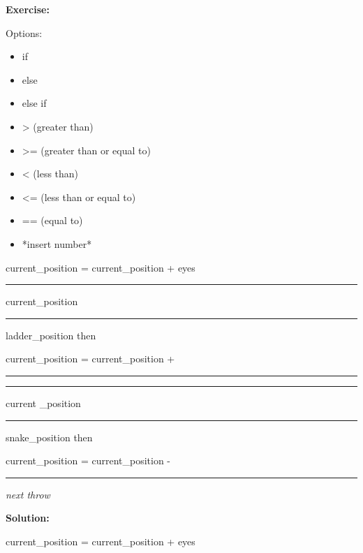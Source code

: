 \textbf{Exercise:}

Options:

\begin{itemize}
\color{red}
\item if
\item else 
\item else if
\end{itemize}

\begin{itemize}
\color{CornflowerBlue}
\item > (greater than)
\item >= (greater than or equal to)
\item < (less than)
\item <= (less than or equal to)
\item == (equal to)
\end{itemize}

\begin{itemize}
\color{Plum}
\item *insert number*
\end{itemize}

\vspace{1cm}

current\_position = current\_position + eyes 

\hspace{0.1cm}


\textcolor{red}{\rule[-0.5ex]{0.7cm}{1pt}} current\_position \textcolor{CornflowerBlue}{\rule[-0.5ex]{0.7cm}{1pt}} ladder\_position then

\hspace{1cm} 
current\_position = current\_position + \textcolor{Plum}{\rule[-0.5ex]{0.7cm}{1pt}}

\hspace{0.1cm}

\textcolor{red}{\rule[-0.5ex]{0.7cm}{1pt}} current \_position \textcolor{CornflowerBlue}{\rule[-0.5ex]{0.7cm}{1pt}} snake\_position then 

\hspace{1cm} current\_position = current\_position - \textcolor{Plum}{\rule[-0.5ex]{0.7cm}{1pt}}

\textit{next throw}

\vspace{1cm}

\textbf{Solution:}


current\_position = current\_position + eyes 

\hspace{0.1cm}


